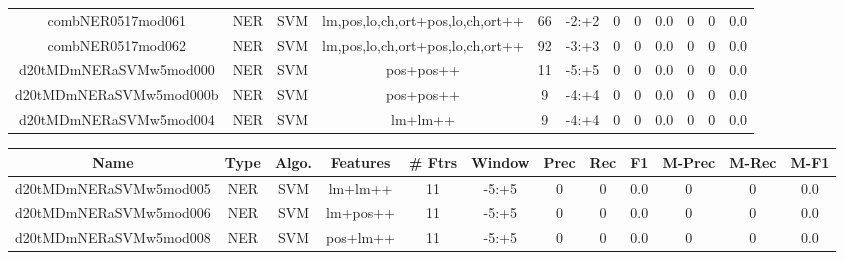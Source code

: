 \documentclass[a4paper]{article}
\begin{document}
\begin{landscape}
\begin{center}
\begin{tabular}{ |c|c|c|c|c|c|c|c|c|c|c|c|}
 
 	
 	\small{ combNER0517mod061 } & \small{ NER} & \small{  SVM }  & lm,pos,lo,ch,ort+pos,lo,ch,ort++  &  66 &  \small{  -2:+2 }  &  0 & 0 & 0.0  &  0 & 0 & 0.0 \\
 	

 
 	
 	\small{ combNER0517mod062 } & \small{ NER} & \small{  SVM }  & lm,pos,lo,ch,ort+pos,lo,ch,ort++  &  92 &  \small{  -3:+3 }  &  0 & 0 & 0.0  &  0 & 0 & 0.0 \\
 	

 
 	
 	\small{ d20tMDmNERaSVMw5mod000 } & \small{ NER} & \small{  SVM }  & pos+pos++  &  11 &  \small{  -5:+5 }  &  0 & 0 & 0.0  &  0 & 0 & 0.0 \\
 	

 
 	
 	\small{ d20tMDmNERaSVMw5mod000b } & \small{ NER} & \small{  SVM }  & pos+pos++  &  9 &  \small{  -4:+4 }  &  0 & 0 & 0.0  &  0 & 0 & 0.0 \\
 	

 
 	
 	\small{ d20tMDmNERaSVMw5mod004 } & \small{ NER} & \small{  SVM }  & lm+lm++  &  9 &  \small{  -4:+4 }  &  0 & 0 & 0.0  &  0 & 0 & 0.0 \\
 	
 \hline
\end{tabular}
\end{center}




\begin{center}
\begin{tabular}{ |c|c|c|c|c|c|c|c|c|c|c|c|} 
 \hline
 	Name & Type & Algo. & Features & \# Ftrs & Window & Prec & Rec & F1 & M-Prec & M-Rec & M-F1\\
 \hline

 	

 
 	
 	\small{ d20tMDmNERaSVMw5mod005 } & \small{ NER} & \small{  SVM }  & lm+lm++  &  11 &  \small{  -5:+5 }  &  0 & 0 & 0.0  &  0 & 0 & 0.0 \\
 	

 
 	
 	\small{ d20tMDmNERaSVMw5mod006 } & \small{ NER} & \small{  SVM }  & lm+pos++  &  11 &  \small{  -5:+5 }  &  0 & 0 & 0.0  &  0 & 0 & 0.0 \\
 	

 
 	
 	\small{ d20tMDmNERaSVMw5mod008 } & \small{ NER} & \small{  SVM }  & pos+lm++  &  11 &  \small{  -5:+5 }  &  0 & 0 & 0.0  &  0 & 0 & 0.0 \\
 	


\end{tabular}
\end{center}
\end{landscape}
\end{document}

